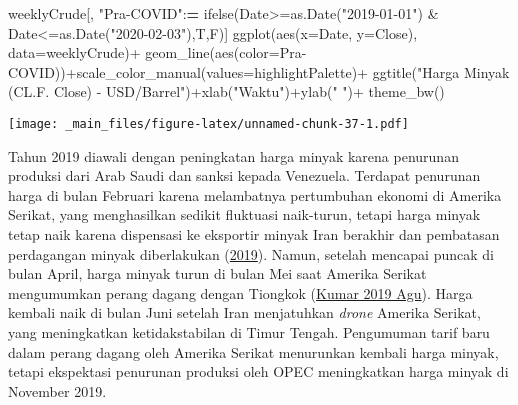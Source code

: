 \documentclass[
]{book}
\newenvironment{Shaded}{\begin{snugshade}}{\end{snugshade}}
\newcommand{\AttributeTok}[1]{\textcolor[rgb]{0.77,0.63,0.00}{#1}}
\newcommand{\ErrorTok}[1]{\textcolor[rgb]{0.64,0.00,0.00}{\textbf{#1}}}
\newcommand{\FunctionTok}[1]{\textcolor[rgb]{0.00,0.00,0.00}{#1}}
\newcommand{\NormalTok}[1]{#1}
\newcommand{\SpecialCharTok}[1]{\textcolor[rgb]{0.00,0.00,0.00}{#1}}
\newcommand{\StringTok}[1]{\textcolor[rgb]{0.31,0.60,0.02}{#1}}
\begin{document}
\begin{Shaded}
\begin{Highlighting}[]
\NormalTok{weeklyCrude[, }\StringTok{"Pra{-}COVID"}\SpecialCharTok{:}\ErrorTok{=}
            \FunctionTok{ifelse}\NormalTok{(Date}\SpecialCharTok{\textgreater{}=}\FunctionTok{as.Date}\NormalTok{(}\StringTok{"2019{-}01{-}01"}\NormalTok{) }\SpecialCharTok{\&}\NormalTok{ Date}\SpecialCharTok{\textless{}=}\FunctionTok{as.Date}\NormalTok{(}\StringTok{"2020{-}02{-}03"}\NormalTok{),T,F)]}
\FunctionTok{ggplot}\NormalTok{(}\FunctionTok{aes}\NormalTok{(}\AttributeTok{x=}\NormalTok{Date, }\AttributeTok{y=}\NormalTok{Close),}
       \AttributeTok{data=}\NormalTok{weeklyCrude)}\SpecialCharTok{+}
  \FunctionTok{geom\_line}\NormalTok{(}\FunctionTok{aes}\NormalTok{(}\AttributeTok{color=}\StringTok{\textasciigrave{}}\AttributeTok{Pra{-}COVID}\StringTok{\textasciigrave{}}\NormalTok{))}\SpecialCharTok{+}\FunctionTok{scale\_color\_manual}\NormalTok{(}\AttributeTok{values=}\NormalTok{highlightPalette)}\SpecialCharTok{+}
  \FunctionTok{ggtitle}\NormalTok{(}\StringTok{"Harga Minyak (CL.F. Close) {-} USD/Barrel"}\NormalTok{)}\SpecialCharTok{+}\FunctionTok{xlab}\NormalTok{(}\StringTok{"Waktu"}\NormalTok{)}\SpecialCharTok{+}\FunctionTok{ylab}\NormalTok{(}\StringTok{" "}\NormalTok{)}\SpecialCharTok{+}
  \FunctionTok{theme\_bw}\NormalTok{()}
\end{Highlighting}
\end{Shaded}

\texttt{[image: \_main\_files/figure-latex/unnamed-chunk-37-1.pdf]}

Tahun 2019 diawali dengan peningkatan harga minyak karena penurunan produksi dari Arab Saudi dan sanksi kepada Venezuela. Terdapat penurunan harga di bulan Februari karena melambatnya pertumbuhan ekonomi di Amerika Serikat, yang menghasilkan sedikit fluktuasi naik-turun, tetapi harga minyak tetap naik karena dispensasi ke eksportir minyak Iran berakhir dan pembatasan perdagangan minyak diberlakukan (\protect\hyperlink{ref-welle_wwwdwcom_us_nodate}{2019}). Namun, setelah mencapai puncak di bulan April, harga minyak turun di bulan Mei saat Amerika Serikat mengumumkan perang dagang dengan Tiongkok (\protect\hyperlink{ref-reu_oil_2019}{Kumar 2019 Agu}). Harga kembali naik di bulan Juni setelah Iran menjatuhkan \emph{drone} Amerika Serikat, yang meningkatkan ketidakstabilan di Timur Tengah. Pengumuman tarif baru dalam perang dagang oleh Amerika Serikat menurunkan kembali harga minyak, tetapi ekspektasi penurunan produksi oleh OPEC meningkatkan harga minyak di November 2019.
\end{document}
